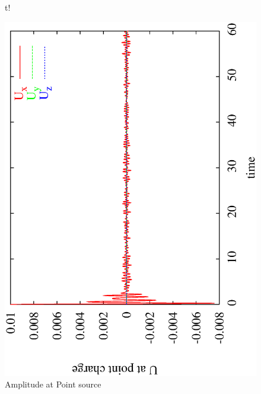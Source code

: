 \begin{figure}{t!}
\centerline{\includegraphics[width=3.in,angle=270]{WavePC.eps}}
\caption{Amplitude at Point source}
\label{WAVE FIG 1}
\end{figure}

